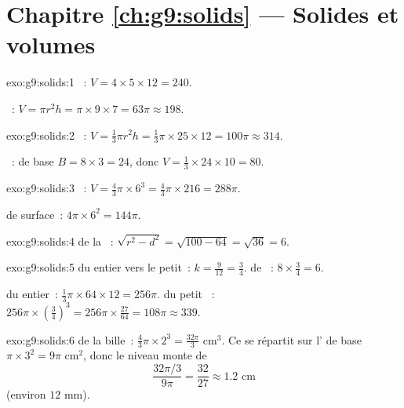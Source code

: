 \section*{Chapitre \ref{ch:g9:solids} --- Solides et volumes}

\begin{solution}{exo:g9:solids:1}
~: $V = 4 \times 5 \times 12 = 240$.

~: $V = \pi r^2 h = \pi \times 9 \times 7 = 63\pi \approx 198$.
\end{solution}

\begin{solution}{exo:g9:solids:2}
~: $V = \frac13 \pi r^2 h = \frac13 \pi \times 25 \times 12 =
100\pi \approx 314$.

~:  de base $B = 8 \times 3 = 24$, donc
$V = \frac13 \times 24 \times 10 = 80$.
\end{solution}

\begin{solution}{exo:g9:solids:3}
~: $V = \frac43 \pi \times 6^3 = \frac43 \pi \times 216 = 288\pi$.

 de surface~: $4\pi \times 6^2 = 144\pi$.
\end{solution}

\begin{solution}{exo:g9:solids:4}
 de la ~: $\sqrt{r^2 - d^2} = \sqrt{100 - 64} = \sqrt{36}
= 6$.
\end{solution}

\begin{solution}{exo:g9:solids:5}
 du  entier vers le petit~:
$k = \frac{9}{12} = \frac34$.  de ~: $8 \times \frac34 = 6$.

 du  entier~: $\frac13\pi \times 64 \times 12 = 256\pi$.
 du petit ~: $256\pi \times \left(\frac34\right)^3 =
256\pi \times \frac{27}{64} = 108\pi \approx 339$.
\end{solution}

\begin{solution}{exo:g9:solids:6}
 de la bille~: $\frac43\pi \times 2^3 = \frac{32\pi}{3}$ cm$^3$.
Ce  se répartit sur l' de base $\pi \times 3^2 = 9\pi$ cm$^2$,
donc le niveau monte de
\[
\frac{32\pi/3}{9\pi} = \frac{32}{27} \approx 1.2 \text{ cm}
\]
(environ $12$ mm).
\end{solution}

